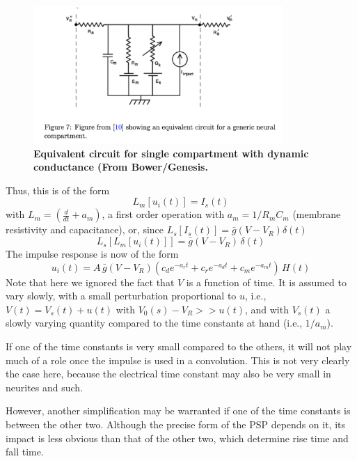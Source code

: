 \documentclass[11pt,oneside]{amsart}
\begin{document}
\begin{figure}[t!]
    \centering
    \includegraphics[width=9.5cm]{figures/bower.png}
    \caption{{\bf Equivalent circuit for single compartment with dynamic conductance (From Bower/Genesis.}}
    \label{fig:linear}
\end{figure}



Thus, this is of the form
\begin{equation}
L_m[u_i(t)]=I_s(t)
\end{equation}
with $L_m = (\frac{d}{dt} +a_m)$, a first order operation with $a_m =1/R_mC_m$ (membrane resistivity and capacitance),  or, since $L_s[I_s(t)]= \bar g(V-V_R) \delta(t) $
 \begin{equation}
L_s[L_m[u_i(t)]]=\bar g(V-V_R)  \, \delta(t)
\end{equation}
The impulse response is now of the form
\begin{equation}
    u_i(t) = A\, \bar g(V-V_R) (c_d e^{-a_rt}+ c_r e^{-a_dt} +c_m e^{-a_mt})\, H(t) 
\end{equation}
Note that here we ignored the fact that $V$ is a function of time. It is assumed to vary slowly, with a small perturbation proportional to $u$, i.e., $V(t)=V_s(t)+u(t)$ with $V_0(s)-V_R>>u(t)$, and with $V_s(t)$ a slowly varying quantity compared to the time constants at hand (i.e., $1/a_m$). 

If one of the time constants is very small compared to the others, it will not play much of a role once the impulse is used in a convolution. This is not very clearly the case here, because the electrical time constant may also be very small in neurites and such. 

However, another simplification may be warranted if one of the time constants is between the other two. Although the precise form of the PSP depends on it, its impact is less obvious than that of the other two, which determine rise time and fall time.
\end{document}
